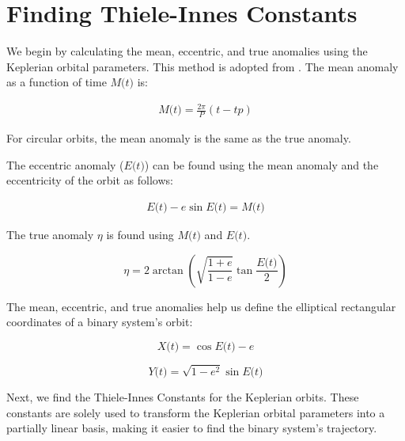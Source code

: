 \documentclass[twocolumn]{aastex701}
\newcommand{\w}{\omega_{pri}}
\newcommand{\eccentricity}{\textit{e}}
\newcommand{\period}{\textit{P}}
\newcommand{\E}{\textit{E(t)}}
\newcommand{\M}{\textit{M(t)}}
\newcommand{\etanom}{\eta}
\begin{document}
\section{Finding Thiele-Innes Constants}
\label{sec:Thiele-Innes}
We begin by calculating the mean, eccentric, and true anomalies using the Keplerian orbital parameters. This method is adopted from \citet{Koren_2016}. The mean anomaly as a function of time $\M$ is:

\begin{eqnarray}
    \label{mean_anomaly}
    \M = \frac{2 \pi}{\period} (t-tp)
\end{eqnarray}

For circular orbits, the mean anomaly is the same as the true anomaly. 

The eccentric anomaly ($\E$) can be found using the mean anomaly and the eccentricity of the orbit as follows:
 
\begin{eqnarray}
    \label{ecc_anomaly}
    \E - \eccentricity \sin \E = \M
\end{eqnarray}

The true anomaly $\etanom$ is found using $\M$ and $\E$. 


\begin{equation}
    \label{true_anomaly}
    \etanom = 2 \arctan \left( \sqrt{\frac{1+\eccentricity}{1-\eccentricity}} \tan{\frac{\E}{2}} \right)
\end{equation}

The mean, eccentric, and true anomalies help us define the elliptical rectangular coordinates of a binary system's orbit: 

\begin{equation}
    \label{ell_rec_coord1}
    \textit{X(t)} = \cos \E - \eccentricity 
\end{equation}

\begin{equation}
    \label{ell_rec_coord2}
    \textit{Y(t)} =  \sqrt{1 - \eccentricity^2} \sin \E
\end{equation}

Next, we find the Thiele-Innes Constants for the Keplerian orbits. These constants are solely used to transform the Keplerian orbital parameters into a partially linear basis, making it easier to find the binary system's trajectory.
\end{document}
